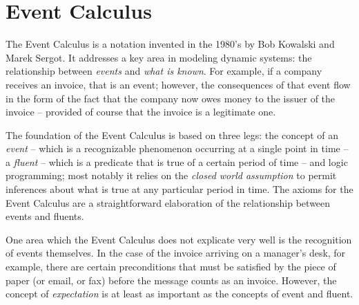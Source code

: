 \chapter{Event Calculus}
\label{event}

The Event Calculus is a notation invented in the 1980's by Bob Kowalski and Marek Sergot. It addresses a key area in modeling dynamic systems: the relationship between \emph{events} and \emph{what is known}. For example, if a company receives an invoice, that is an event; however, the consequences of that event flow in the form of the fact that the company now owes money to the issuer of the invoice -- provided of course that the invoice is a legitimate one.

The foundation of the Event Calculus is based on three legs: the concept of an \emph{event} -- which is a recognizable phenomenon occurring at a single point in time -- a \emph{fluent} -- which is a predicate that is true of a certain period of time -- and logic programming; most notably it relies on the \emph{closed world assumption} to permit inferences about what is true at any particular period in time. The axioms for the Event Calculus are a straightforward elaboration of the relationship between events and fluents.

One area which the Event Calculus does not explicate very well is the recognition of events themselves. In the case of the invoice arriving on a manager's desk, for example, there are certain preconditions that must be satisfied by the piece of paper (or email, or fax) before the message counts as an invoice. However, the concept of \emph{expectation} is at least as important as the concepts of event and fluent.

